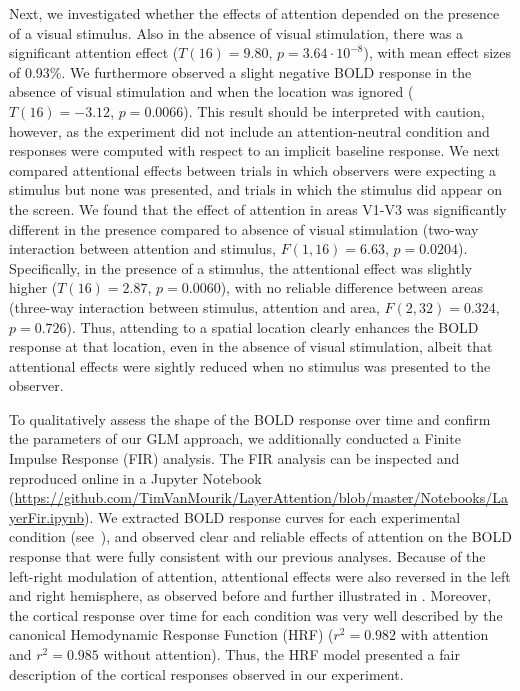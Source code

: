 \documentclass[9pt,lineno]{aperture}
\begin{document}
Next, we investigated whether the effects of attention depended on the presence of a visual stimulus. Also in the absence of visual stimulation, there was a significant attention effect ($T(16)=9.80$, $p=3.64 \cdot 10^{-8}$), with mean effect sizes of 0.93\%. We furthermore observed a slight negative BOLD response in the absence of visual stimulation and when the location was ignored ($T(16)=-3.12$, $p=0.0066$). This result should be interpreted with caution, however, as the experiment did not include an attention-neutral condition and responses were computed with respect to an implicit baseline response. We next compared attentional effects between trials in which observers were expecting a stimulus but none was presented, and trials in which the stimulus did appear on the screen. We found that the effect of attention in areas V1-V3 was significantly different in the presence compared to absence of visual stimulation (two-way interaction between attention and stimulus, $F(1,16)=6.63$, $p=0.0204$). Specifically, in the presence of a stimulus, the attentional effect was slightly higher ($T(16)=2.87$, $p=0.0060$), with no reliable difference between areas (three-way interaction between stimulus, attention and area, $F(2,32)=0.324$, $p=0.726$). Thus, attending to a spatial location clearly enhances the BOLD response at that location, even in the absence of visual stimulation, albeit that attentional effects were sightly reduced when no stimulus was presented to the observer. 

To  qualitatively assess the shape of the BOLD response over time and confirm the parameters of our GLM approach, we additionally conducted a Finite Impulse Response (FIR) analysis. The FIR analysis can be inspected and reproduced online in a Jupyter Notebook (\url{https://github.com/TimVanMourik/LayerAttention/blob/master/Notebooks/LayerFir.ipynb}). We extracted BOLD response curves for each experimental condition (see~), and observed clear and reliable effects of attention on the BOLD response that were fully consistent with our previous analyses. Because of the left-right modulation of attention, attentional effects were also reversed in the left and right hemisphere, as observed before and further illustrated in . Moreover, the cortical response over time for each condition was very well described by the canonical Hemodynamic Response Function (HRF) ($r^2=0.982$ with attention and $r^2=0.985$ without attention). Thus, the HRF model presented a fair description of the cortical responses observed in our experiment. 
\end{document}

